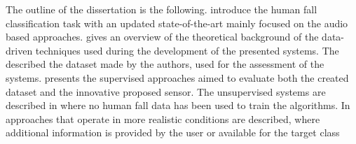 The outline of the dissertation is the following.
introduce the human fall classification task with an updated state-of-the-art mainly focused on the audio based approaches.  gives an overview of the theoretical background of the data-driven techniques used during the development of the presented systems. The  described the dataset made by the authors, used for the assessment of the systems.  presents the supervised approaches aimed to evaluate both the created dataset and the innovative proposed sensor.
The unsupervised systems are described in  where no human fall data has been used to train the algorithms.
In  approaches that operate in more realistic conditions are described, where additional information is provided by the user or available for the target class





